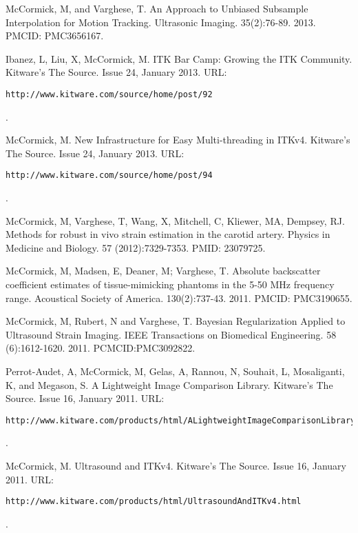 \documentclass[margin,line]{res}
\begin{document}
\begin{resume}
McCormick, M, and Varghese, T.  An Approach to Unbiased Subsample Interpolation
for Motion Tracking.  Ultrasonic Imaging.  35(2):76-89.  2013.  PMCID: PMC3656167.

Ibanez, L, Liu, X, McCormick, M.  ITK Bar Camp: Growing the ITK Community.  Kitware's
The Source.  Issue 24, January 2013.
\vspace*{-.25in}
URL: \begin{verbatim}http://www.kitware.com/source/home/post/92\end{verbatim}.
\vspace*{-.35in}

McCormick, M.  New Infrastructure for Easy Multi-threading in ITKv4.  Kitware's
The Source.  Issue 24, January 2013.
\vspace*{-.25in}
URL: \begin{verbatim}http://www.kitware.com/source/home/post/94\end{verbatim}.
\vspace*{-.35in}

McCormick, M, Varghese, T, Wang, X, Mitchell, C, Kliewer, MA, Dempsey, RJ.
Methods for robust in vivo strain estimation in the carotid artery.
Physics in Medicine and Biology. 57 (2012):7329-7353.  PMID: 23079725.

McCormick, M, Madsen, E, Deaner, M; Varghese, T.
Absolute backscatter coefficient estimates of tissue-mimicking phantoms in the
5-50 MHz frequency range.
Acoustical Society of America.  130(2):737-43.  2011.  PMCID: PMC3190655.

McCormick, M, Rubert, N and Varghese, T.  Bayesian Regularization Applied to
Ultrasound Strain Imaging.  IEEE Transactions on Biomedical Engineering.
58 (6):1612-1620.  2011.  PCMCID:PMC3092822.

Perrot-Audet, A, McCormick, M, Gelas, A, Rannou, N, Souhait, L, Mosaliganti, K,
and Megason, S.  A Lightweight Image Comparison Library.  Kitware's The Source.
Issue 16, January 2011.
\vspace*{-.25in}
URL: \begin{verbatim}http://www.kitware.com/products/html/ALightweightImageComparisonLibrary.html\end{verbatim}.
\vspace*{-.35in}

McCormick, M.  Ultrasound and ITKv4.  Kitware's The Source.  Issue 16, January
2011.
\vspace*{-.25in}
URL: \begin{verbatim}http://www.kitware.com/products/html/UltrasoundAndITKv4.html\end{verbatim}.
\vspace*{-.35in}


\end{resume}
\end{document}
